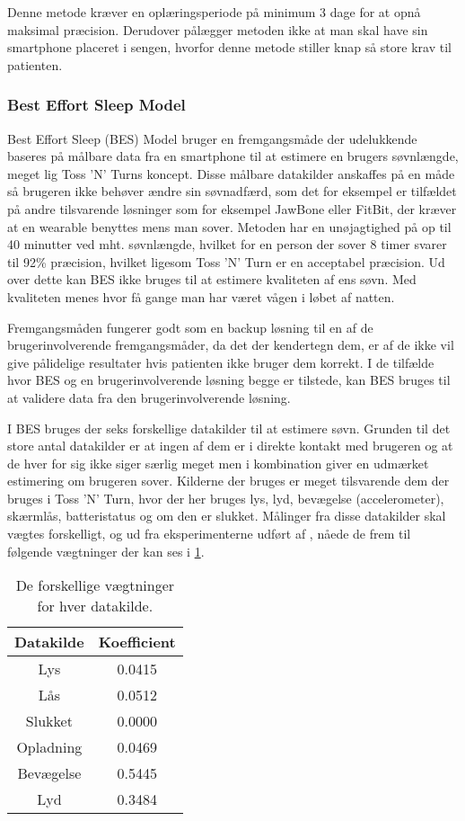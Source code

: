 Denne metode kræver en oplæringsperiode på minimum 3 dage for at opnå maksimal præcision.
Derudover pålægger metoden ikke at man skal have sin smartphone placeret i sengen, hvorfor denne metode stiller knap så store krav til patienten.

\subsubsection{Best Effort Sleep Model}\label{sec:BES}
Best Effort Sleep (BES) Model \citet{6563918} bruger en fremgangsmåde der udelukkende baseres på målbare data fra en smartphone til at estimere en brugers søvnlængde, meget lig Toss 'N' Turns koncept.
Disse målbare datakilder anskaffes på en måde så brugeren ikke behøver ændre sin søvnadfærd, som det for eksempel er tilfældet på andre tilsvarende løsninger som for eksempel JawBone eller FitBit, der kræver at en wearable benyttes mens man sover.
Metoden har en unøjagtighed på op til 40 minutter ved mht. søvnlængde, hvilket for en person der sover 8 timer svarer til 92\% præcision, hvilket ligesom Toss 'N' Turn er en acceptabel præcision.
Ud over dette kan BES ikke bruges til at estimere kvaliteten af ens søvn.
Med kvaliteten menes hvor få gange man har været vågen i løbet af natten.

Fremgangsmåden fungerer godt som en backup løsning til en af de brugerinvolverende fremgangsmåder, da det der kendertegn dem, er af de ikke vil give pålidelige resultater hvis patienten ikke bruger dem korrekt.
I de tilfælde hvor BES og en brugerinvolverende løsning begge er tilstede, kan BES bruges til at validere data fra den brugerinvolverende løsning. 

I BES bruges der seks forskellige datakilder til at estimere søvn.
Grunden til det store antal datakilder er at ingen af dem er i direkte kontakt med brugeren og at de hver for sig ikke siger særlig meget men i kombination giver en udmærket estimering om brugeren sover.
Kilderne der bruges er meget tilsvarende dem der bruges i Toss 'N' Turn, hvor der her bruges lys, lyd, bevægelse (accelerometer), skærmlås, batteristatus og om den er slukket.
Målinger fra disse datakilder skal vægtes forskelligt, og ud fra eksperimenterne udført af \citet{6563918}, nåede de frem til følgende vægtninger der kan ses i \cref{tab:vaegtninger}.

\begin{table}[h]
\centering
\begin{tabular}{|c|c|}
\hline Datakilde & Koefficient\\
\hline Lys & 0.0415 \\ 
\hline Lås & 0.0512 \\ 
\hline Slukket & 0.0000 \\ 
\hline Opladning & 0.0469 \\ 
\hline Bevægelse & 0.5445 \\ 
\hline Lyd & 0.3484 \\ 
\hline 
\end{tabular}
\caption{De forskellige vægtninger for hver datakilde.}
\label{tab:vaegtninger}
\end{table}

